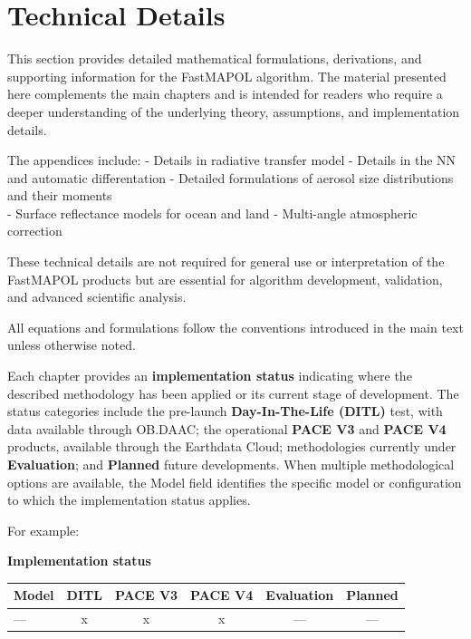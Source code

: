 \documentclass[
  11pt,
  letterpaper,
]{scrreprt}
\begin{document}
\cleardoublepage
{}
{}
\appendix

\chapter{Technical Details}\label{technical-details-1}

This section provides detailed mathematical formulations, derivations,
and supporting information for the FastMAPOL algorithm. The material
presented here complements the main chapters and is intended for readers
who require a deeper understanding of the underlying theory,
assumptions, and implementation details.

The appendices include: - Details in radiative transfer model - Details
in the NN and automatic differentation - Detailed formulations of
aerosol size distributions and their moments\\
- Surface reflectance models for ocean and land - Multi-angle
atmospheric correction

These technical details are not required for general use or
interpretation of the FastMAPOL products but are essential for algorithm
development, validation, and advanced scientific analysis.

All equations and formulations follow the conventions introduced in the
main text unless otherwise noted.

Each chapter provides an \textbf{implementation status} indicating where
the described methodology has been applied or its current stage of
development. The status categories include the pre-launch
\textbf{Day-In-The-Life (DITL)} test, with data available through
OB.DAAC; the operational \textbf{PACE V3} and \textbf{PACE V4} products,
available through the Earthdata Cloud; methodologies currently under
\textbf{Evaluation}; and \textbf{Planned} future developments. When
multiple methodological options are available, the Model field
identifies the specific model or configuration to which the
implementation status applies.

For example:

\textbf{Implementation status}

\begin{longtable}[]{@{}lccccc@{}}
\toprule\noalign{}
Model & DITL & PACE V3 & PACE V4 & Evaluation & Planned \\
\midrule\noalign{}
\endhead
\bottomrule\noalign{}
\endlastfoot
--- & x & x & x & --- & --- \\
\end{longtable}
\end{document}
